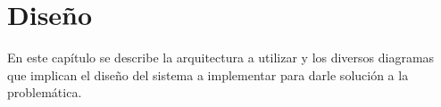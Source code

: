 \chapter{Diseño}
En este capítulo se describe la arquitectura a utilizar y los diversos diagramas que implican el diseño del sistema a implementar para darle solución a la problemática.


\clearpage




\clearpage
 